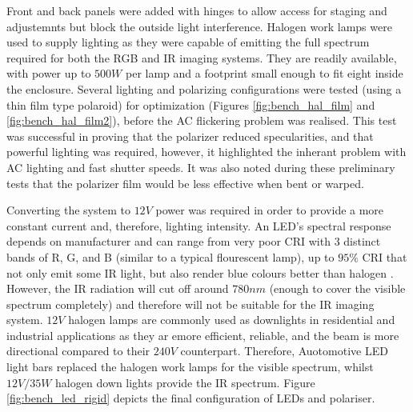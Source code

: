 \documentclass[fleqn,twoside]{article}
\begin{document}
Front and back panels were added with hinges to allow access for staging and adjustemnts but block the outside light interference. Halogen work lamps were used to supply lighting as they were capable of emitting the full spectrum required for both the RGB and IR imaging systems. They are readily available, with power up to $500W$ per lamp and a footprint small enough to fit eight inside the enclosure. Several lighting and polarizing configurations were tested (using a thin film type polaroid) for optimization (Figures \ref{fig:bench_hal_film} and \ref{fig:bench_hal_film2}), before the AC flickering problem was realised. This test was successful in proving that the polarizer reduced specularities, and that powerful lighting was required, however, it highlighted the inherant problem with AC lighting and fast shutter speeds. It was also noted during these preliminary tests that the polarizer film would be less effective when bent or warped.  

Converting the system to $12V$ power was required in order to provide a more constant current and, therefore, lighting intensity. An LED's spectral response depends on manufacturer and can range from very poor CRI with 3 distinct bands of R, G, and B (similar to a typical flourescent lamp), up to $95\%$ CRI that not only emit some IR light, but also render blue colours better than halogen \cite{lumicrest}. However, the IR radiation will cut off around $780nm$ (enough to cover the visible spectrum completely) and therefore will not be suitable for the IR imaging system. $12V$ halogen lamps are commonly used as downlights in residential and industrial applications as they ar emore efficient, reliable, and the beam is more directional compared to their $240V$ counterpart. Therefore, Auotomotive LED light bars replaced the halogen work lamps for the visible spectrum, whilst $12V/35W$ halogen down lights provide the IR spectrum. Figure \ref{fig:bench_led_rigid} depicts the final configuration of LEDs and polariser.
\end{document}
